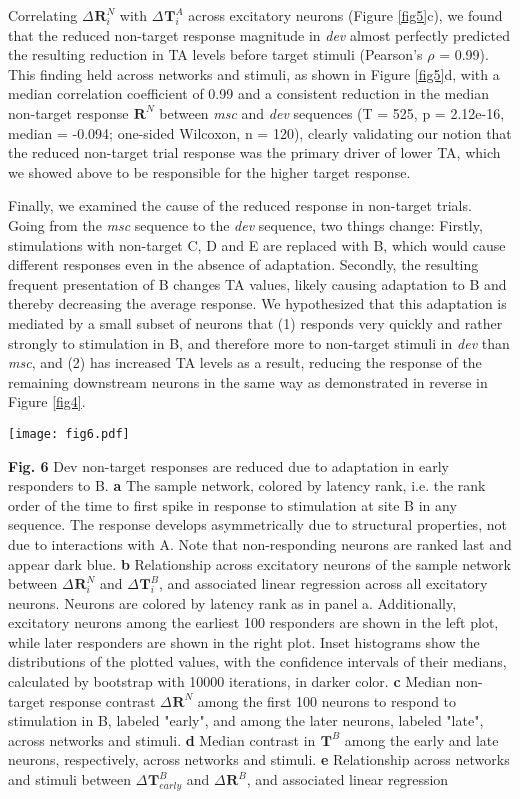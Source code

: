 \documentclass[pdflatex,referee,iicol,sn-basic]{sn-jnl}
\newcommand{\dev}{\textit{dev}}
\newcommand{\msc}{\textit{msc}}
\renewcommand{\R}[3][]{{}^{#1}_{}\!\mathbf{R}^{#2}_{#3}}
\renewcommand{\T}[3][]{{}^{#1}_{}\mathbf{T}^{#2}_{#3}}
\theoremstyle{thmstyleone}%
\theoremstyle{thmstyletwo}%
\theoremstyle{thmstylethree}%
\begin{document}
Correlating $\Delta \R{N}{i}$ with $\Delta \T{A}{i}$ across excitatory neurons (Figure \ref{fig5}c), we found that the reduced non-target response magnitude in \dev{} almost perfectly predicted the resulting reduction in TA levels before target stimuli (Pearson's $\rho$ = 0.99).
This finding held across networks and stimuli, as shown in Figure \ref{fig5}d, with a median correlation coefficient of 0.99 and a consistent reduction in the median non-target response $\R{N}{}$ between \msc{} and \dev{} sequences (T = 525, p = 2.12e-16, median = -0.094; one-sided Wilcoxon, n = 120), clearly validating our notion that the reduced non-target trial response was the primary driver of lower TA, which we showed above to be responsible for the higher target response.

Finally, we examined the cause of the reduced response in non-target trials. Going from the \msc{} sequence to the \dev{} sequence, two things change: Firstly, stimulations with non-target C, D and E are replaced with B, which would cause different responses even in the absence of adaptation. Secondly, the resulting  frequent presentation of B changes TA values, likely causing adaptation to B and thereby decreasing the average response. We hypothesized that this adaptation is mediated by a small subset of neurons that (1) responds very quickly and rather strongly to stimulation in B, and therefore more to non-target stimuli in \dev{} than \msc{}, and (2) has increased TA levels as a result, reducing the response of the remaining downstream neurons in the same way as demonstrated in reverse in Figure \ref{fig4}.

\begin{figure*}%
    \centering
    \texttt{[image: fig6.pdf]}
    \caption{}
    \label{fig6}
\end{figure*}
\textbf{Fig. 6} Dev non-target responses are reduced due to adaptation in early responders to B.
\textbf{a} The sample network, colored by latency rank, i.e. the rank order of the time to first spike in response to stimulation at site B in any sequence. The response develops asymmetrically due to structural properties, not due to interactions with A. Note that non-responding neurons are ranked last and appear dark blue.
\textbf{b} Relationship across excitatory neurons of the sample network between $\Delta \R{N}{i}$ and $\Delta \T{B}{i}$, and associated linear regression across all excitatory neurons. Neurons are colored by latency rank as in panel a. Additionally, excitatory neurons among the earliest 100 responders are shown in the left plot, while later responders are shown in the right plot. Inset histograms show the distributions of the plotted values, with the confidence intervals of their medians, calculated by bootstrap with 10000 iterations, in darker color.
\textbf{c} Median non-target response contrast $\Delta \R{N}{}$ among the first 100 neurons to respond to stimulation in B, labeled "early", and among the later neurons, labeled "late", across networks and stimuli.
\textbf{d} Median contrast in $\T{B}{}$ among the early and late neurons, respectively, across networks and stimuli.
\textbf{e} Relationship across networks and stimuli between $\Delta \T{B}{early}$ and $\Delta \R{B}{}$, and associated linear regression
\end{document}
